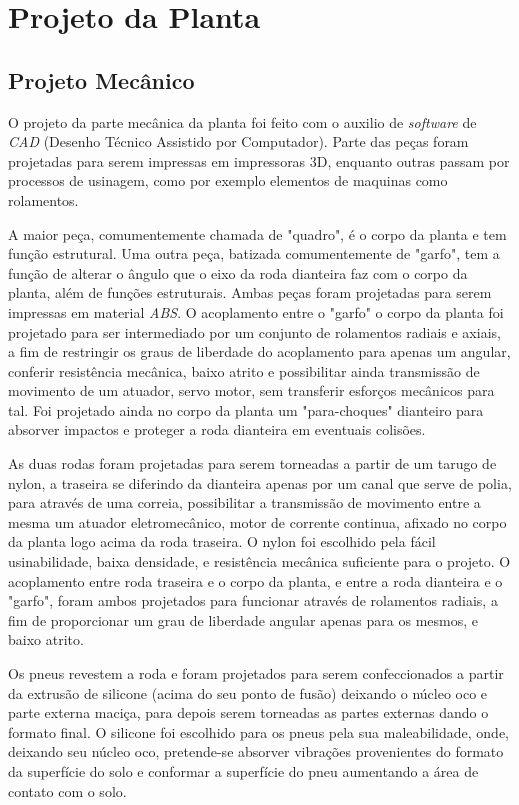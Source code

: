 \documentclass[conference,harvard,brazil,english]{sbatex}
\begin{document}
    \section{Projeto da Planta}
    
        \subsection{Projeto Mecânico}
            
            O projeto da parte mecânica da planta foi feito com o auxilio de \textit{software} de \textit{CAD} (Desenho Técnico Assistido por Computador). Parte das peças foram projetadas para serem impressas em impressoras 3D, enquanto outras passam por processos de usinagem, como por exemplo elementos de maquinas como rolamentos.
            
            A maior peça, comumentemente chamada de "quadro", é o corpo da planta e tem função estrutural. Uma outra peça, batizada comumentemente de "garfo", tem a função de alterar o ângulo que o eixo da roda dianteira faz com o corpo da planta, além de funções estruturais. Ambas peças foram projetadas para serem impressas em material \textit{ABS}. O acoplamento entre o "garfo" o corpo da planta foi projetado para ser intermediado por um conjunto de rolamentos radiais e axiais, a fim de restringir os graus de liberdade do acoplamento para apenas um angular, conferir resistência mecânica, baixo atrito e possibilitar ainda transmissão de movimento de um atuador, servo motor, sem transferir esforços mecânicos para tal. Foi projetado ainda no corpo da planta um "para-choques" dianteiro para absorver impactos e proteger a roda dianteira em eventuais colisões.
            
            As duas rodas foram projetadas para serem torneadas a partir de um tarugo de nylon, a traseira se diferindo da dianteira apenas por um canal que serve de polia, para através de uma correia, possibilitar a transmissão de movimento entre a mesma um atuador eletromecânico, motor de corrente continua, afixado no corpo da planta logo acima da roda traseira. O nylon foi escolhido pela fácil usinabilidade, baixa densidade, e resistência mecânica suficiente para o projeto. O acoplamento entre roda traseira e o corpo da planta, e entre a roda dianteira e o "garfo", foram ambos projetados para funcionar através de rolamentos radiais, a fim de proporcionar um grau de liberdade angular apenas para os mesmos, e baixo atrito.
            
            Os pneus revestem a roda e foram projetados para serem confeccionados a partir da extrusão de silicone (acima do seu ponto de fusão) deixando o núcleo oco e parte externa maciça, para depois serem torneadas as partes externas dando o formato final. O silicone foi escolhido para os pneus pela sua maleabilidade, onde, deixando seu núcleo oco, pretende-se absorver vibrações provenientes do formato da superfície do solo e conformar a superfície do pneu aumentando a área de contato com o solo.
            
\end{document}
